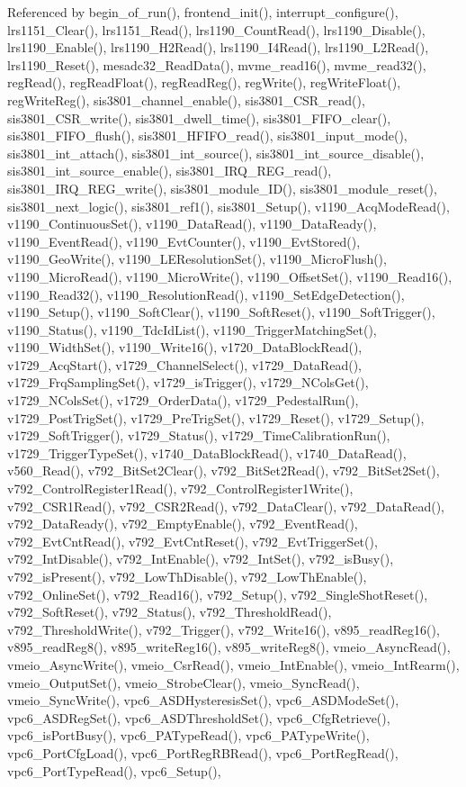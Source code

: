 Referenced by begin\_\-of\_\-run(), frontend\_\-init(), interrupt\_\-configure(), lrs1151\_\-Clear(), lrs1151\_\-Read(), lrs1190\_\-CountRead(), lrs1190\_\-Disable(), lrs1190\_\-Enable(), lrs1190\_\-H2Read(), lrs1190\_\-I4Read(), lrs1190\_\-L2Read(), lrs1190\_\-Reset(), mesadc32\_\-ReadData(), mvme\_\-read16(), mvme\_\-read32(), regRead(), regReadFloat(), regReadReg(), regWrite(), regWriteFloat(), regWriteReg(), sis3801\_\-channel\_\-enable(), sis3801\_\-CSR\_\-read(), sis3801\_\-CSR\_\-write(), sis3801\_\-dwell\_\-time(), sis3801\_\-FIFO\_\-clear(), sis3801\_\-FIFO\_\-flush(), sis3801\_\-HFIFO\_\-read(), sis3801\_\-input\_\-mode(), sis3801\_\-int\_\-attach(), sis3801\_\-int\_\-source(), sis3801\_\-int\_\-source\_\-disable(), sis3801\_\-int\_\-source\_\-enable(), sis3801\_\-IRQ\_\-REG\_\-read(), sis3801\_\-IRQ\_\-REG\_\-write(), sis3801\_\-module\_\-ID(), sis3801\_\-module\_\-reset(), sis3801\_\-next\_\-logic(), sis3801\_\-ref1(), sis3801\_\-Setup(), v1190\_\-AcqModeRead(), v1190\_\-ContinuousSet(), v1190\_\-DataRead(), v1190\_\-DataReady(), v1190\_\-EventRead(), v1190\_\-EvtCounter(), v1190\_\-EvtStored(), v1190\_\-GeoWrite(), v1190\_\-LEResolutionSet(), v1190\_\-MicroFlush(), v1190\_\-MicroRead(), v1190\_\-MicroWrite(), v1190\_\-OffsetSet(), v1190\_\-Read16(), v1190\_\-Read32(), v1190\_\-ResolutionRead(), v1190\_\-SetEdgeDetection(), v1190\_\-Setup(), v1190\_\-SoftClear(), v1190\_\-SoftReset(), v1190\_\-SoftTrigger(), v1190\_\-Status(), v1190\_\-TdcIdList(), v1190\_\-TriggerMatchingSet(), v1190\_\-WidthSet(), v1190\_\-Write16(), v1720\_\-DataBlockRead(), v1729\_\-AcqStart(), v1729\_\-ChannelSelect(), v1729\_\-DataRead(), v1729\_\-FrqSamplingSet(), v1729\_\-isTrigger(), v1729\_\-NColsGet(), v1729\_\-NColsSet(), v1729\_\-OrderData(), v1729\_\-PedestalRun(), v1729\_\-PostTrigSet(), v1729\_\-PreTrigSet(), v1729\_\-Reset(), v1729\_\-Setup(), v1729\_\-SoftTrigger(), v1729\_\-Status(), v1729\_\-TimeCalibrationRun(), v1729\_\-TriggerTypeSet(), v1740\_\-DataBlockRead(), v1740\_\-DataRead(), v560\_\-Read(), v792\_\-BitSet2Clear(), v792\_\-BitSet2Read(), v792\_\-BitSet2Set(), v792\_\-ControlRegister1Read(), v792\_\-ControlRegister1Write(), v792\_\-CSR1Read(), v792\_\-CSR2Read(), v792\_\-DataClear(), v792\_\-DataRead(), v792\_\-DataReady(), v792\_\-EmptyEnable(), v792\_\-EventRead(), v792\_\-EvtCntRead(), v792\_\-EvtCntReset(), v792\_\-EvtTriggerSet(), v792\_\-IntDisable(), v792\_\-IntEnable(), v792\_\-IntSet(), v792\_\-isBusy(), v792\_\-isPresent(), v792\_\-LowThDisable(), v792\_\-LowThEnable(), v792\_\-OnlineSet(), v792\_\-Read16(), v792\_\-Setup(), v792\_\-SingleShotReset(), v792\_\-SoftReset(), v792\_\-Status(), v792\_\-ThresholdRead(), v792\_\-ThresholdWrite(), v792\_\-Trigger(), v792\_\-Write16(), v895\_\-readReg16(), v895\_\-readReg8(), v895\_\-writeReg16(), v895\_\-writeReg8(), vmeio\_\-AsyncRead(), vmeio\_\-AsyncWrite(), vmeio\_\-CsrRead(), vmeio\_\-IntEnable(), vmeio\_\-IntRearm(), vmeio\_\-OutputSet(), vmeio\_\-StrobeClear(), vmeio\_\-SyncRead(), vmeio\_\-SyncWrite(), vpc6\_\-ASDHysteresisSet(), vpc6\_\-ASDModeSet(), vpc6\_\-ASDRegSet(), vpc6\_\-ASDThresholdSet(), vpc6\_\-CfgRetrieve(), vpc6\_\-isPortBusy(), vpc6\_\-PATypeRead(), vpc6\_\-PATypeWrite(), vpc6\_\-PortCfgLoad(), vpc6\_\-PortRegRBRead(), vpc6\_\-PortRegRead(), vpc6\_\-PortTypeRead(), vpc6\_\-Setup(), 